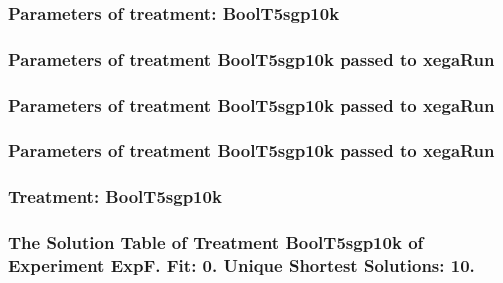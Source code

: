 \documentclass[18pt,c]{beamer}
\begin{document}
 \begin{frame}
 \fontsize{8pt}{9pt}\selectfont
 \frametitle{  Parameters of treatment: BoolT5sgp10k 
 }

 \label{ExpFtParmTable000.tex}  
 \end{frame}


 \begin{frame}
 \fontsize{8pt}{9pt}\selectfont
 \frametitle{  Parameters of treatment BoolT5sgp10k passed to xegaRun
 }

 \label{ExpFtParmTable001.tex}  
 \end{frame}


 \begin{frame}
 \fontsize{8pt}{9pt}\selectfont
 \frametitle{  Parameters of treatment BoolT5sgp10k passed to xegaRun
 }

 \label{ExpFtParmTable002.tex}  
 \end{frame}


 \begin{frame}
 \fontsize{8pt}{9pt}\selectfont
 \frametitle{  Parameters of treatment BoolT5sgp10k passed to xegaRun
 }

 \label{ExpFtParmTable003.tex}  
 \end{frame}

 \begin{frame}
 \fontsize{8pt}{9pt}\selectfont
 \frametitle{ Treatment: BoolT5sgp10k }

 \label{ExpFStatsTable003.tex}  
 \end{frame}

 \begin{frame}
 \fontsize{8pt}{9pt}\selectfont
 \frametitle{ The Solution Table of Treatment BoolT5sgp10k of Experiment ExpF. Fit: 0. Unique Shortest Solutions: 10. }

 \label{ExpFSolutionTable000.tex}  
 \end{frame}
\end{document}
